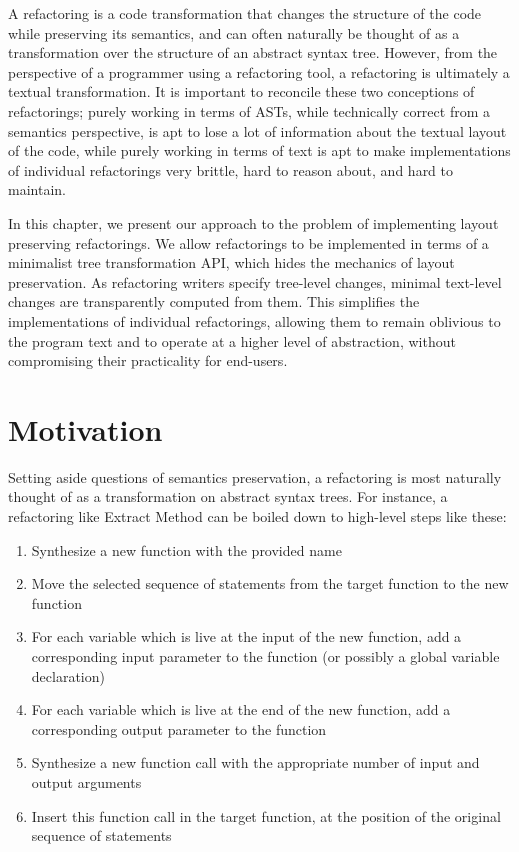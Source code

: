 A refactoring is a code transformation that changes the structure of the code
while preserving its semantics, and can often naturally be thought of as a
transformation over the structure of an abstract syntax tree. However, from
the perspective of a programmer using a refactoring tool, a refactoring is
ultimately a textual transformation. It is important to reconcile these two
conceptions of refactorings; purely working in terms of ASTs, while
technically correct from a semantics perspective, is apt to lose a lot
of information about the textual layout of the code, while purely working
in terms of text is apt to make implementations of individual refactorings
very brittle, hard to reason about, and hard to maintain.

In this chapter, we present our approach to the problem of implementing layout
preserving refactorings. We allow refactorings to be implemented in terms of a
minimalist tree transformation API, which hides the mechanics of layout
preservation. As refactoring writers specify tree-level changes, minimal
text-level changes are transparently computed from them. This simplifies the
implementations of individual refactorings, allowing them to remain oblivious
to the program text and to operate at a higher level of abstraction, without
compromising their practicality for end-users.

\section{Motivation}

Setting aside questions of semantics preservation, a refactoring is most
naturally thought of as a transformation on abstract syntax trees. For
instance, a refactoring like Extract Method can be boiled down to high-level
steps like these:

\begin{enumerate}
  \item Synthesize a new function with the provided name
  \item Move the selected sequence of statements from the target function to
    the new function
  \item For each variable which is live at the input of the new function, add a
    corresponding input parameter to the function (or possibly a global
    variable declaration)
  \item For each variable which is live at the end of the new function, add a
    corresponding output parameter to the function
  \item Synthesize a new function call with the appropriate number of input and
    output arguments
  \item Insert this function call in the target function, at the position of
    the original sequence of statements
\end{enumerate}

